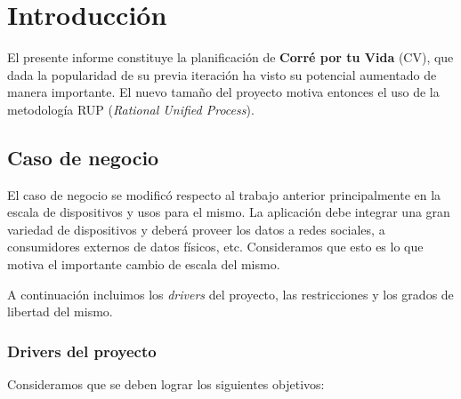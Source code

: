 \section{Introducción}

El presente informe constituye la planificación de \textbf{Corré por tu
Vida} (CV), que dada la popularidad de su previa iteración ha visto su
potencial aumentado de manera importante. El nuevo tamaño del proyecto
motiva entonces el uso de la metodología RUP (\emph{Rational Unified
Process}).

\subsection{Caso de negocio}

El caso de negocio se modificó respecto al trabajo anterior
principalmente en la escala de dispositivos y usos para el mismo. La
aplicación debe integrar una gran variedad de dispositivos y deberá
proveer los datos a redes sociales, a consumidores externos de datos
físicos, etc. Consideramos que esto es lo que motiva el importante
cambio de escala del mismo.

A continuación incluimos los \emph{drivers} del proyecto, las
restricciones y los grados de libertad del mismo.

\subsubsection{Drivers del proyecto}

Consideramos que se deben lograr los siguientes objetivos:

